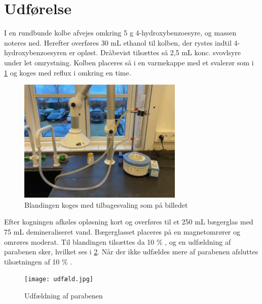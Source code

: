 \documentclass{report}
\begin{document}
\section*{Udførelse}
I en rundbunde kolbe afvejes omkring 5 g 4-hydroxybenzoesyre, og massen noteres ned.
Herefter overføres 30 mL ethanol til kolben, der rystes indtil 4-hydroxybenzoesyren er opløst. 
Dråbevist tilsættes så 2,5 mL konc. svovlsyre under let omrystning.
Kolben placeres så i en varmekappe med et svalerør som i \cref{fig:kog} og koges med reflux i omkring en time.
\begin{figure}[H]
\begin{center}
  \includegraphics[width=0.7\textwidth]{kog.jpg}
\end{center}
\caption{Blandingen koges med tilbagesvaling som på billedet}
\label{fig:kog}
\end{figure}
Efter kogningen afkøles opløsning kort og overføres til et 250 mL bægerglas med 75 mL demineraliseret vand. 
Bægerglasset placeres på en magnetomrører og omrøres moderat.
Til blandingen tilsættes da 10 \% , og en udfældning af parabenen sker, hvilket ses i \cref{fig:udfæld}.
Når der ikke udfældes mere af parabenen afsluttes tilsætningen af 10 \% .
\begin{figure}[H]
\begin{center}
  \texttt{[image: udfæld.jpg]}
\end{center}
\caption{Udfældning af parabenen}
\label{fig:udfæld}
\end{figure}
\end{document}
